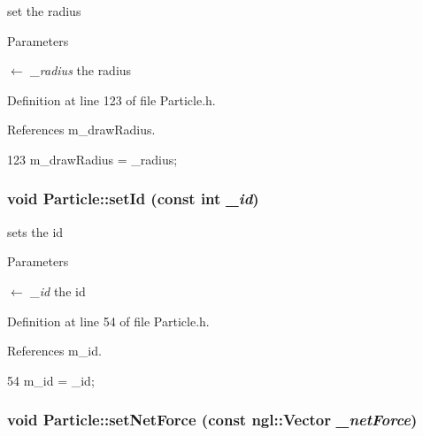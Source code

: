 set the radius 


\begin{DoxyParams}{Parameters}
\item[\mbox{$\leftarrow$} {\em \_\-radius}]the radius \end{DoxyParams}


Definition at line 123 of file Particle.h.



References m\_\-drawRadius.




\begin{DoxyCode}
123 { m_drawRadius = _radius; }
\end{DoxyCode}


\hypertarget{class_particle_a874b156fe77eec11b80075c5708c283c}{
\subsubsection[{setId}]{\setlength{\rightskip}{0pt plus 5cm}void Particle::setId (const int {\em \_\-id})}}
\label{class_particle_a874b156fe77eec11b80075c5708c283c}


sets the id 


\begin{DoxyParams}{Parameters}
\item[\mbox{$\leftarrow$} {\em \_\-id}]the id \end{DoxyParams}


Definition at line 54 of file Particle.h.



References m\_\-id.




\begin{DoxyCode}
54 { m_id = _id; }
\end{DoxyCode}


\hypertarget{class_particle_a1f67bd1a59758665c698c07c135e5b10}{
\subsubsection[{setNetForce}]{\setlength{\rightskip}{0pt plus 5cm}void Particle::setNetForce (const ngl::Vector {\em \_\-netForce})}}
\label{class_particle_a1f67bd1a59758665c698c07c135e5b10}


